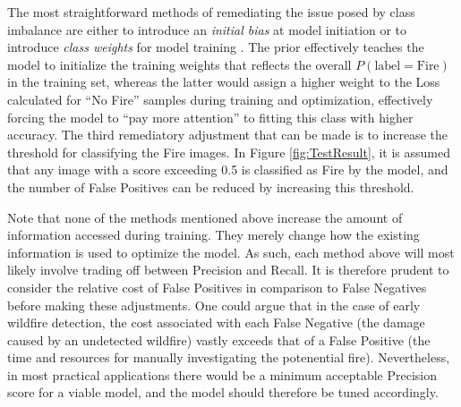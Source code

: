 \documentclass[a4paper,11pt]{article} %
\begin{document}
\medskip

The most straightforward methods of remediating the issue posed by class imbalance are either to introduce an \emph{initial bias} at model
initiation or to introduce \emph{class weights} for model training \cite{TF_Imbalanced_data_tutorial}. The prior effectively teaches the model to
initialize the training weights that reflects the overall $P(\text{label}=\text{Fire})$ in the training set, whereas the latter would assign
a higher weight to the Loss calculated for ``No Fire'' samples during training and optimization, effectively forcing the model to ``pay more attention''
to fitting this class with higher accuracy. The third remediatory adjustment that can be made is to increase the threshold for classifying the Fire images.
In Figure \ref{fig:TestResult}, it is assumed that any image with a score exceeding 0.5 is classified as Fire by the model, and the number
of False Positives can be reduced by increasing this threshold.

\medskip

Note that none of the methods mentioned above increase the amount of information accessed during training. They merely change how the existing information is used to optimize the model. 
As such, each method above will most likely involve trading off between Precision and Recall. It is therefore prudent to consider the relative
cost of False Positives in comparison to False Negatives before making these adjustments. One could argue that in the case of early wildfire detection, the cost
associated with each False Negative (the damage caused by an undetected wildfire) vastly exceeds that of a False Positive (the time and resources for manually investigating the potenential fire).
Nevertheless, in most practical applications there would be a minimum acceptable Precision score for a viable model, and the model should therefore be tuned accordingly.
\end{document}
